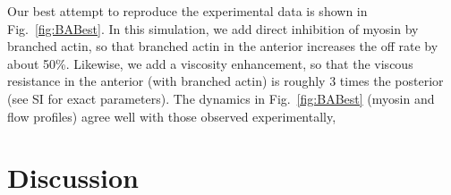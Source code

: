 \documentclass[11pt]{article}
\newcommand{\6}[1]{#1_{\text{6}}}
\newcommand{\3}[1]{#1_{\text{3}}}
\begin{document}
Our best attempt to reproduce the experimental data is shown in Fig.\ \ref{fig:BABest}. In this simulation, we add direct inhibition of myosin by branched actin, so that branched actin in the anterior increases the off rate by about 50\%. Likewise, we add a viscosity enhancement, so that the viscous resistance in the anterior (with branched actin) is roughly 3 times the posterior (see SI for exact parameters). The dynamics in Fig.\ \ref{fig:BABest} (myosin and flow profiles) agree well with those observed experimentally, 



\section{Discussion}






\end{document}
